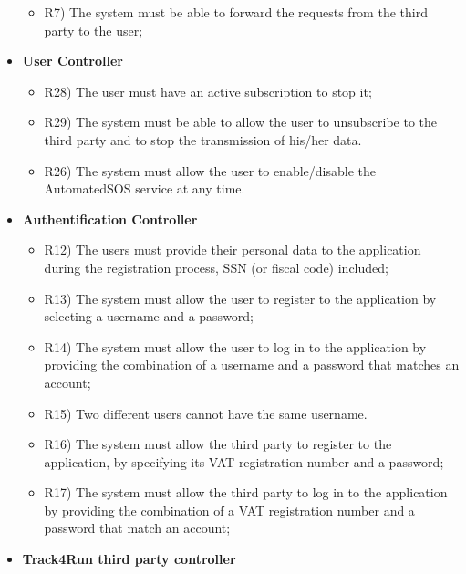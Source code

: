 \begin{itemize}
		\begin{itemize}
			\item R7) The system must be able to forward the requests from the third party to the user;\\
		\end{itemize}
		\item \textbf{User Controller}
		\begin{itemize}
			\item R28) The user must have an active subscription to stop it;\\
	 		\item R29) The system must be able to allow the user to unsubscribe to the third party and to stop the transmission of his/her data.\\
	 		\item R26) The system must allow the user to enable/disable the AutomatedSOS service at any time.\\
		\end{itemize}
		\item \textbf{Authentification Controller}
		\begin{itemize}
			\item R12) The users must provide their personal data to the application during the registration process, SSN (or fiscal code) included;\\
			\item R13) The system must allow the user to register to the application by selecting a username and a password;\\
			\item R14) The system must allow the user to log in to the application by providing the combination of a username and a password that matches an account;\\
			\item R15) Two different users cannot have the same username.\\
			\item R16) The system must allow the third party to register to the application, by specifying its VAT registration number and a password;\\
			\item R17) The system must allow the third party to log in to the application by providing the combination of a VAT registration number and a password that match an account;\\
		\end{itemize}
		\item \textbf{Track4Run third party controller}\

\end{itemize}

